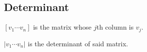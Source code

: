 





\subsection{Determinant}

\begin{definition}
  $\left[ v_1 \cdots v_n \right]$ is the matrix whose $j$th column is $v_j$.
  
  $\left| v_1 \cdots v_n \right|$ is the determinant of said matrix.
\end{definition}

